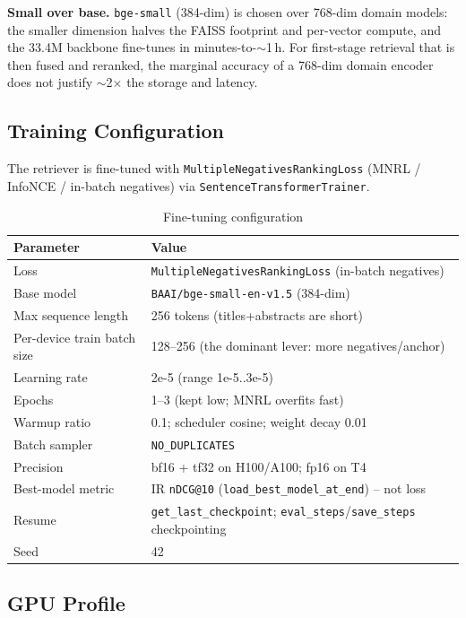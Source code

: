 \documentclass[12pt,a4paper]{article}
\begin{document}
\textbf{Small over base.} \texttt{bge-small} (384-dim) is chosen over 768-dim domain models: the smaller dimension halves the FAISS footprint and per-vector compute, and the 33.4M backbone fine-tunes in minutes-to-$\sim$1\,h. For first-stage retrieval that is then fused and reranked, the marginal accuracy of a 768-dim domain encoder does not justify $\sim$2$\times$ the storage and latency.

\subsection{Training Configuration}

The retriever is fine-tuned with \texttt{MultipleNegativesRankingLoss} (MNRL / InfoNCE / in-batch negatives) via \texttt{SentenceTransformerTrainer}.

\begin{table}[H]
\centering
\caption{Fine-tuning configuration}
\begin{tabular}{ll}
\toprule
\textbf{Parameter} & \textbf{Value} \\
\midrule
Loss & \texttt{MultipleNegativesRankingLoss} (in-batch negatives) \\
Base model & \texttt{BAAI/bge-small-en-v1.5} (384-dim) \\
Max sequence length & 256 tokens (titles+abstracts are short) \\
Per-device train batch size & 128--256 (the dominant lever: more negatives/anchor) \\
Learning rate & 2e-5 (range 1e-5..3e-5) \\
Epochs & 1--3 (kept low; MNRL overfits fast) \\
Warmup ratio & 0.1; scheduler cosine; weight decay 0.01 \\
Batch sampler & \texttt{NO\_DUPLICATES} \\
Precision & bf16 + tf32 on H100/A100; fp16 on T4 \\
Best-model metric & IR \texttt{nDCG@10} (\texttt{load\_best\_model\_at\_end}) -- not loss \\
Resume & \texttt{get\_last\_checkpoint}; \texttt{eval\_steps}/\texttt{save\_steps} checkpointing \\
Seed & 42 \\
\bottomrule
\end{tabular}
\end{table}

\subsection{GPU Profile}
\end{document}
